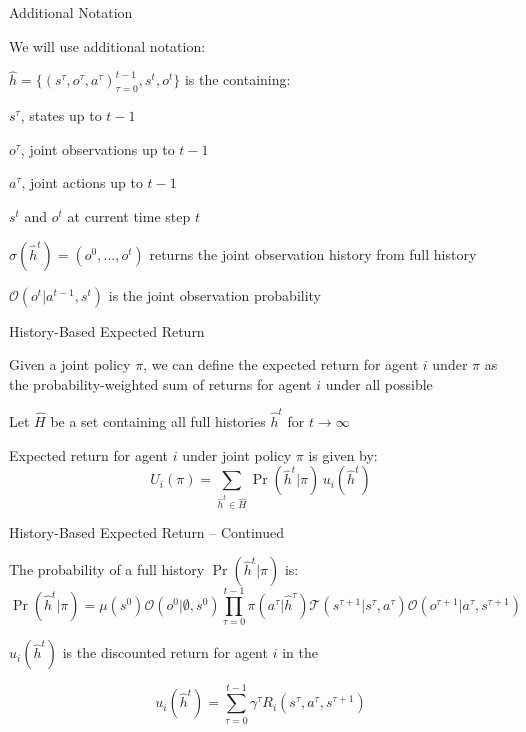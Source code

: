 \begin{frame}{Additional Notation}

    We will use additional notation: 

    \blist
        \item \(\hat{h} = \{(s^{\tau}, o^{\tau}, a^{\tau})_{\tau = 0}^{t-1}, s^t, o^t\}\) is the  containing:\\[3pt]
        \blist
            \item \(s^\tau\), states up to \(t-1\)
            \item \(o^\tau\), joint observations up to \(t-1\)
            \item  \(a^{\tau}\), joint actions up to \(t-1\)
            \item \(s^t\) and \(o^t\) at current time step \(t\)
        \elist
        \item \(\sigma(\hat{h}^t) = (o^0, ..., o^t)\) returns the joint observation history from full history
        \item \(\mathcal{O}(o^t|a^{t-1}, s^t)\) is the joint observation probability
    \elist
    
\end{frame}

\begin{frame}{History-Based Expected Return}

    Given a joint policy \(\pi\), we can define the expected return for agent \(i\) under \(\pi\) as the probability-weighted sum of returns for agent \(i\) under all possible 
    \vspace{5pt}
    \blist
        \item Let $\hat{H}$ be a set containing all full histories $\hat{h}^t$ for $t \to \infty$
        \item Expected return for agent $i$ under joint policy \(\pi\) is given by:
    		$$ U_i(\pi) = \sum_{\hat{h}^t \in \hat{H}} \Pr(\hat{h}^t|\pi) \, u_i(\hat{h}^t) $$
    \elist

\end{frame}

\begin{frame}{History-Based Expected Return -- Continued}

    The probability of a full history $\Pr(\hat{h}^t|\pi)$ is:
    \vspace{2pt}
    \[
        \Pr(\hat{h}^t | \pi) = \mu(s^0)\mathcal{O}(o^0 | \emptyset, s^0) \prod_{\tau=0}^{t-1} \pi(a^\tau | \hat{h}^\tau)\mathcal{T}(s^{\tau+1} | s^\tau, a^\tau)\mathcal{O}(o^{\tau+1} | a^\tau, s^{\tau+1})
    \]

    \(u_i(\hat{h}^t)\) is the discounted return for agent \(i\) in the 

    \[
        u_i(\hat{h}^t) = \sum_{\tau=0}^{t-1} \gamma^\tau R_i(s^\tau, a^\tau, s^{\tau+1})
    \]
    
\end{frame}

